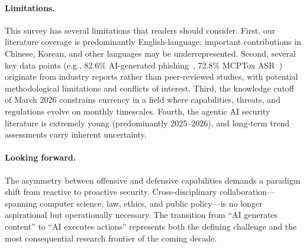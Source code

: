 \paragraph{Limitations.}
This survey has several limitations that readers should consider. First, our literature coverage is predominantly English-language; important contributions in Chinese, Korean, and other languages may be underrepresented. Second, several key data points (e.g., 82.6\% AI-generated phishing~\cite{knowbe4_2025}, 72.8\% MCPTox ASR~\cite{wang2025mcptox}) originate from industry reports rather than peer-reviewed studies, with potential methodological limitations and conflicts of interest. Third, the knowledge cutoff of March 2026 constrains currency in a field where capabilities, threats, and regulations evolve on monthly timescales. Fourth, the agentic AI security literature is extremely young (predominantly 2025--2026), and long-term trend assessments carry inherent uncertainty.

\paragraph{Looking forward.}
The asymmetry between offensive and defensive capabilities demands a paradigm shift from reactive to proactive security. Cross-disciplinary collaboration---spanning computer science, law, ethics, and public policy---is no longer aspirational but operationally necessary. The transition from ``AI generates content'' to ``AI executes actions'' represents both the defining challenge and the most consequential research frontier of the coming decade.
